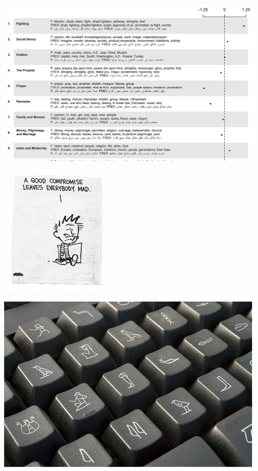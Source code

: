 \documentclass{mediumfoils}
\begin{document}

\centerline{\includegraphics[scale=.8]{pictures/stm-clerics}}


\centerline{\includegraphics[scale=1.5]{pictures/compromise.png}}



\centerline{\includegraphics[scale=1]{pictures/hieroglyphic-keyboard-cm}}
\end{document}
